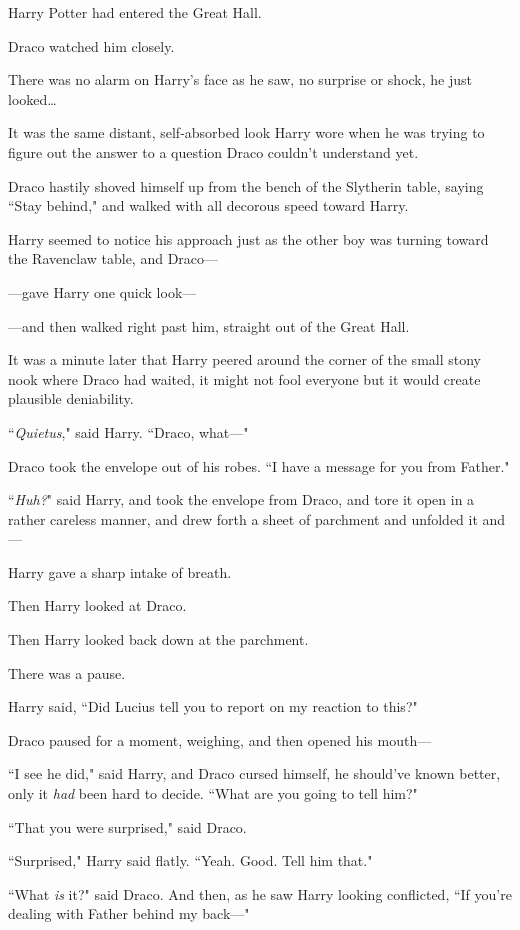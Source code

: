 Harry Potter had entered the Great Hall.

Draco watched him closely.

There was no alarm on Harry's face as he saw, no surprise or shock, he just looked{\ldots}

It was the same distant, self-absorbed look Harry wore when he was trying to figure out the answer to a question Draco couldn't understand yet.

Draco hastily shoved himself up from the bench of the Slytherin table, saying ``Stay behind," and walked with all decorous speed toward Harry.

Harry seemed to notice his approach just as the other boy was turning toward the Ravenclaw table, and Draco—

—gave Harry one quick look—

—and then walked right past him, straight out of the Great Hall.

It was a minute later that Harry peered around the corner of the small stony nook where Draco had waited, it might not fool everyone but it would create plausible deniability.

``\emph{Quietus}," said Harry. ``Draco, what—"

Draco took the envelope out of his robes. ``I have a message for you from Father."

``\emph{Huh?}" said Harry, and took the envelope from Draco, and tore it open in a rather careless manner, and drew forth a sheet of parchment and unfolded it and—

Harry gave a sharp intake of breath.

Then Harry looked at Draco.

Then Harry looked back down at the parchment.

There was a pause.

Harry said, ``Did Lucius tell you to report on my reaction to this?"

Draco paused for a moment, weighing, and then opened his mouth—

``I see he did," said Harry, and Draco cursed himself, he should've known better, only it \emph{had} been hard to decide. ``What are you going to tell him?"

``That you were surprised," said Draco.

``Surprised," Harry said flatly. ``Yeah. Good. Tell him that."

``What \emph{is} it?" said Draco. And then, as he saw Harry looking conflicted, ``If you're dealing with Father behind my back—"

